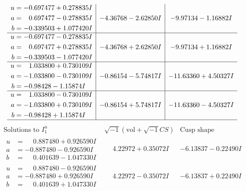 \documentclass[1p]{elsarticle_modified}
\theoremstyle{definition}
\newcommand{\I}{\sqrt{-1}}
\begin{document}
$$\begin{array}{c|c|c}
\begin{aligned}
u &= -0.697477 + 0.278835 I \\
a &= \phantom{-}0.697477 - 0.278835 I \\
b &= -0.339503 + 1.077420 I\end{aligned}
 & -4.36768 - 2.62850 I & -9.97134 - 1.16882 I \\ \hline\begin{aligned}
u &= -0.697477 - 0.278835 I \\
a &= \phantom{-}0.697477 + 0.278835 I \\
b &= -0.339503 - 1.077420 I\end{aligned}
 & -4.36768 + 2.62850 I & -9.97134 + 1.16882 I \\ \hline\begin{aligned}
u &= \phantom{-}1.033800 + 0.730109 I \\
a &= -1.033800 - 0.730109 I \\
b &= -0.98428 - 1.15874 I\end{aligned}
 & -0.86154 - 5.74817 I & -11.63360 + 4.50327 I \\ \hline\begin{aligned}
u &= \phantom{-}1.033800 - 0.730109 I \\
a &= -1.033800 + 0.730109 I \\
b &= -0.98428 + 1.15874 I\end{aligned}
 & -0.86154 + 5.74817 I & -11.63360 - 4.50327 I\\
 \hline 
 \end{array}$$\newpage$$\begin{array}{c|c|c}  
\text{Solutions to }I^u_{1}& \I (\text{vol} + \sqrt{-1}CS) & \text{Cusp shape}\\
 \hline 
\begin{aligned}
u &= \phantom{-}0.887480 + 0.926590 I \\
a &= -0.887480 - 0.926590 I \\
b &= \phantom{-}0.401639 - 1.047330 I\end{aligned}
 & \phantom{-}4.22972 + 0.35072 I & -6.13837 - 0.22490 I \\ \hline\begin{aligned}
u &= \phantom{-}0.887480 - 0.926590 I \\
a &= -0.887480 + 0.926590 I \\
b &= \phantom{-}0.401639 + 1.047330 I\end{aligned}
 & \phantom{-}4.22972 - 0.35072 I & -6.13837 + 0.22490 I \\ \hline\begin{aligned}

\end{aligned}
\end{array}$$
\end{document}
